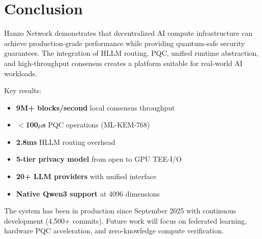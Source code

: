\section{Conclusion}


Hanzo Network demonstrates that decentralized AI compute infrastructure can achieve production-grade performance while providing quantum-safe security guarantees. The integration of HLLM routing, PQC, unified runtime abstraction, and high-throughput consensus creates a platform suitable for real-world AI workloads.

Key results:
\begin{itemize}
\item \textbf{9M+ blocks/second} local consensus throughput
\item \textbf{$<$100$\mu$s} PQC operations (ML-KEM-768)
\item \textbf{2.8ms} HLLM routing overhead
\item \textbf{5-tier privacy model} from open to GPU TEE-I/O
\item \textbf{20+ LLM providers} with unified interface
\item \textbf{Native Qwen3 support} at 4096 dimensions
\end{itemize}

The system has been in production since September 2025 with continuous development (4,500+ commits). Future work will focus on federated learning, hardware PQC acceleration, and zero-knowledge compute verification.

